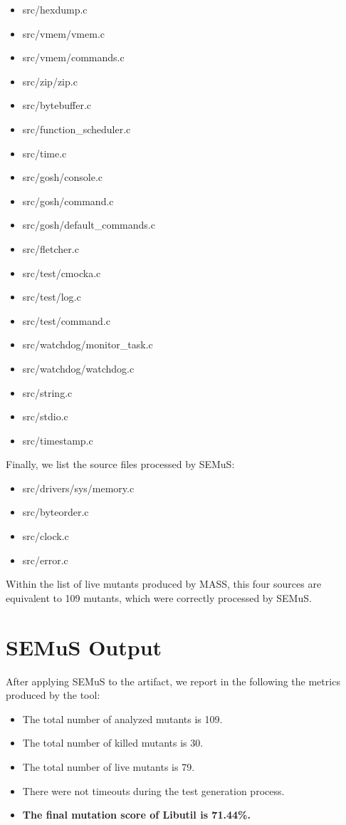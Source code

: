 \begin{itemize}
\item src/hexdump.c
\item src/vmem/vmem.c
\item src/vmem/commands.c
\item src/zip/zip.c
\item src/bytebuffer.c
\item src/function\_scheduler.c
\item src/time.c
\item src/gosh/console.c
\item src/gosh/command.c
\item src/gosh/default\_commands.c
\item src/fletcher.c
\item src/test/cmocka.c
\item src/test/log.c
\item src/test/command.c
\item src/watchdog/monitor\_task.c
\item src/watchdog/watchdog.c
\item src/string.c
\item src/stdio.c
\item src/timestamp.c
\end{itemize}

Finally, we list the source files processed by SEMuS:

\begin{itemize}
\item src/drivers/sys/memory.c
\item src/byteorder.c
\item src/clock.c
\item src/error.c
\end{itemize}

Within the list of live mutants produced by MASS, this four sources are equivalent to 109 mutants, which were correctly processed by SEMuS.

\section{SEMuS Output}

After applying SEMuS to the artifact, we report in the following the metrics produced by the tool:

\begin{itemize}
	\item The total number of analyzed mutants is 109.
	\item The total number of killed mutants is 30.
	\item The total number of live mutants is 79.
	\item There were not timeouts during the test generation process.
	\item \textbf{The final mutation score of Libutil is 71.44\%.}
\end{itemize}

